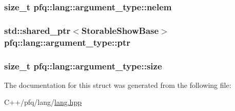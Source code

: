 \subsubsection[{\texorpdfstring{nelem}{nelem}}]{\setlength{\rightskip}{0pt plus 5cm}size\+\_\+t pfq\+::lang\+::argument\+\_\+type\+::nelem}\hypertarget{structpfq_1_1lang_1_1argument__type_ac0016fd1fba8c2cb6922093a9561473f}{}\label{structpfq_1_1lang_1_1argument__type_ac0016fd1fba8c2cb6922093a9561473f}
\subsubsection[{\texorpdfstring{ptr}{ptr}}]{\setlength{\rightskip}{0pt plus 5cm}std\+::shared\+\_\+ptr$<$Storable\+Show\+Base$>$ pfq\+::lang\+::argument\+\_\+type\+::ptr}\hypertarget{structpfq_1_1lang_1_1argument__type_a5b291ef1d2a04a9e238ad29643a77830}{}\label{structpfq_1_1lang_1_1argument__type_a5b291ef1d2a04a9e238ad29643a77830}
\subsubsection[{\texorpdfstring{size}{size}}]{\setlength{\rightskip}{0pt plus 5cm}size\+\_\+t pfq\+::lang\+::argument\+\_\+type\+::size}\hypertarget{structpfq_1_1lang_1_1argument__type_ae5d502317434728683578c32b6056275}{}\label{structpfq_1_1lang_1_1argument__type_ae5d502317434728683578c32b6056275}


The documentation for this struct was generated from the following file\+:\begin{DoxyCompactItemize}
\item 
C++/pfq/lang/\hyperlink{lang_8hpp}{lang.\+hpp}\end{DoxyCompactItemize}
